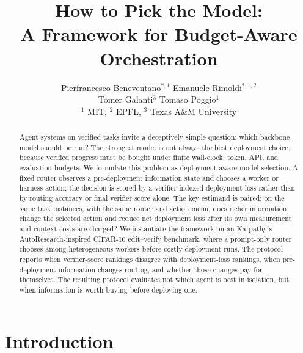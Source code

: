 \documentclass{article}
\title{How to Pick the Model:\\
A Framework for Budget-Aware Orchestration}
\author{%
  Pierfrancesco Beneventano$^{*,1}$ \quad Emanuele Rimoldi$^{*,1,2}$ \\
  Tomer Galanti$^3$ \quad Tomaso Poggio$^1$ \\
  $^1$ MIT, $^2$ EPFL, $^3$ Texas A\&M University
}
\newcommand{\pier}[1]{{\color{red}Pier: #1}}
\begin{document}
\maketitle

\begin{abstract}
Agent systems on verified tasks invite a deceptively simple question: which backbone model should be run? The strongest model is not always the best deployment choice, because verified progress must be bought under finite wall-clock, token, API, and evaluation budgets. We formulate this problem as deployment-aware model selection. A fixed router observes a pre-deployment information state and chooses a worker or harness action; the decision is scored by a verifier-indexed deployment loss rather than by routing accuracy or final verifier score alone. The key estimand is paired: on the same task instances, with the same router and action menu, does richer information change the selected action and reduce net deployment loss after its own measurement and context costs are charged? We instantiate the framework on an Karpathy's AutoResearch-inspired CIFAR-10 edit--verify benchmark, where a prompt-only router chooses among heterogeneous workers before costly deployment runs. The protocol reports when verifier-score rankings disagree with deployment-loss rankings, when pre-deployment information changes routing, and whether those changes pay for themselves. The resulting protocol evaluates not which agent is best in isolation, but when information is worth buying before deploying one.
\end{abstract}

\section{Introduction}
\label{sec:intro}

\end{document}
